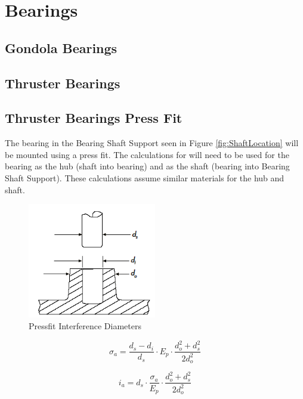 \documentclass[../main.tex]{subfiles}
\begin{document}
\section{Bearings} \label{Bearings}
\subsection{Gondola Bearings}

\subsection{Thruster Bearings}

\subsection{Thruster Bearings Press Fit}
The bearing in the Bearing Shaft Support seen in Figure \ref{fig:ShaftLocation} will be mounted using a press fit. The calculations \cite{pressfit} for will need to be used for the bearing as the hub (shaft into bearing) and as the shaft (bearing into Bearing Shaft Support). These calculations assume similar materials for the hub and shaft.

\begin{figure}[H]
	\centering
	\includegraphics[width=0.5\textwidth]{img/analysis/thruster/pressfit.png}
	\caption{Pressfit Interference Diameters \cite{pressfit}}
	\label{fig:pressfit}
\end{figure}

\begin{equation}
\sigma_a=\frac{d_s-d_i}{d_s}\cdot{}E_p\cdot{}
\frac{d_o^2+d_s^2}{2d_o^2}
\end{equation}

\begin{equation}
i_a=d_s\cdot{}\frac{\sigma_a}{E_p}\cdot{}
\frac{d_o^2+d_s^2}{2d_o^2}
\end{equation}
\end{document}
